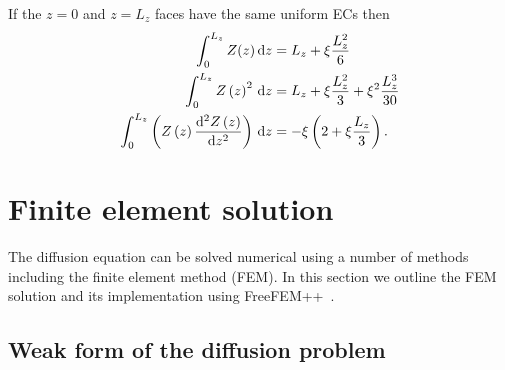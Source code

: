 \documentclass[a4paper]{article}
\numberwithin{equation}{section}
\begin{document}
If the $z=0$ and $z=L_z$ faces have the same uniform ECs then
\begin{align}
\int_0^{L_z} Z(z)\,\mathrm{d}{z} &= L_z+\xi\frac{L_z^2}{6} \\
\int_0^{L_z} Z\left(z\right)^2\,\mathrm{d}{z} &= L_z+\xi\frac{L_z^2}{3}+\xi^2\frac{L_z^3}{30} \\
\int_0^{L_z} \left(Z\left(z\right)\frac{\mathrm{d}^2Z\left(z\right)}{\mathrm{d} z^2}\right)\,\mathrm{d}{z} &=-\xi\left(2+\xi \frac{L_z} 3\right).
\end{align}


\section[Finite element solution]{Finite element solution}
\label{sc:fem}

The diffusion equation can be solved numerical using a number of methods
including the finite element method (FEM). In this section we outline the FEM 
solution and its implementation using FreeFEM++~\citep{Hecht2013,Hecht2017}.

\subsection[Weak form of the diffusion problem]{Weak form of the diffusion problem}
\label{sc:fem:weak}
\end{document}
